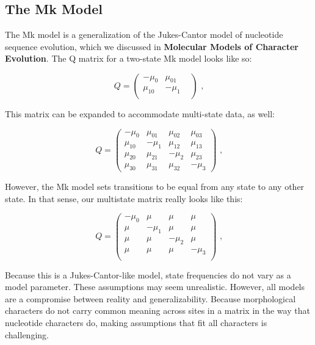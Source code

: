\subsection{The Mk Model}

The Mk model is a generalization of the Jukes-Cantor model of nucleotide sequence evolution, which we discussed in \textbf{Molecular Models of Character Evolution}. 
The Q matrix for a two-state Mk model looks like so:

\begin{equation*}
Q = \begin{pmatrix} -\mu_0 & \mu_{01} \\
\mu_{10} & -\mu_1  &\\
\end{pmatrix} \mbox{  ,}
\end{equation*}

This matrix can be expanded to accommodate multi-state data, as well:

\begin{equation*}
Q = \begin{pmatrix} -\mu_0 & \mu_{01} & \mu_{02} & \mu_{03} \\
\mu_{10} & -\mu_1  & \mu_{12} & \mu_{13} \\
\mu_{20} & \mu_{21} & -\mu_2  & \mu_{23} \\
\mu_{30} & \mu_{31} & \mu_{32} & -\mu_3 
\end{pmatrix} \mbox{  ,}
\end{equation*}

However, the Mk model sets transitions to be equal from any state to any other state. 
In that sense, our multistate matrix really looks like this:

\begin{equation*}
Q = \begin{pmatrix} -\mu_0 & \mu & \mu & \mu \\
\mu & -\mu_1  & \mu & \mu \\
\mu & \mu & -\mu_2  & \mu \\
\mu & \mu & \mu & -\mu_3 \\
\end{pmatrix} \mbox{  ,}
\end{equation*}

Because this is a Jukes-Cantor-like model, state frequencies do not vary as a model parameter.
These assumptions may seem unrealistic.
However, all models are a compromise between reality and generalizability.
Because morphological characters do not carry common meaning across sites in a matrix in the way that nucleotide characters do, making assumptions that fit all characters is challenging. \par

